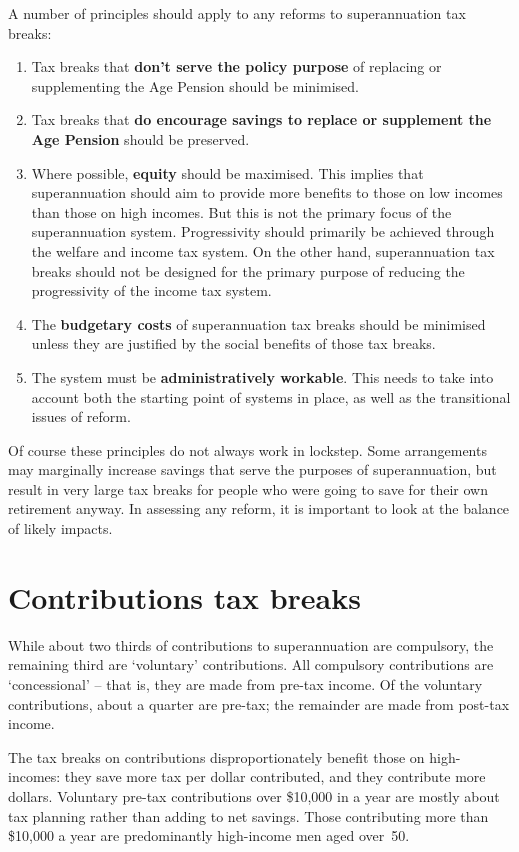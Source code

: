 A number of principles should apply to any reforms to superannuation tax breaks:
\begin{enumerate}
\item Tax breaks that \textbf{don't serve the policy purpose} of replacing or supplementing the Age Pension should be minimised.
\item	Tax breaks that \textbf{do encourage savings to replace or supplement the Age Pension} should be preserved. 
\item	Where possible, \textbf{equity} should be maximised. This implies that superannuation should aim to provide more benefits to those on low incomes than those on high incomes. But this is not the primary focus of the superannuation system. Progressivity should primarily be achieved through the welfare and income tax system. On the other hand, superannuation tax breaks should not be designed for the primary purpose of reducing the progressivity of the income tax system. 
\item	The \textbf{budgetary costs} of superannuation tax breaks should be minimised unless they are justified by the social benefits of those tax breaks.
\item	The system must be \textbf{administratively workable}. This needs to take into account both the starting point of systems in place, as well as the transitional issues of reform.
\end{enumerate}

Of course these principles do not always work in lockstep. Some arrangements may marginally increase savings that serve the purposes of superannuation, but result in very large tax breaks for people who were going to save for their own retirement anyway. In assessing any reform, it is important to look at the balance of likely impacts.



\chapter{Contributions tax breaks}
While about two thirds of contributions to superannuation are compulsory, the remaining third are ‘voluntary’ contributions. All compulsory contributions are ‘concessional’ – that is, they are made from pre-tax income. Of the voluntary contributions, about a quarter are pre-tax; the remainder are made from post-tax income.

The tax breaks on contributions disproportionately benefit those on high-incomes: they save more tax per dollar contributed, and they contribute more dollars. Voluntary pre-tax contributions over \$10,000 in a year are mostly about tax planning rather than adding to net savings. Those contributing more than \$10,000 a year are predominantly high-income men aged over~50. 

